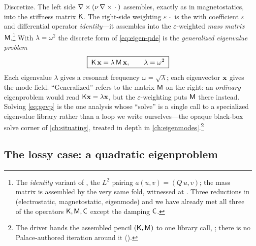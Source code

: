 Discretize. The left side $\nabla\times(\nu\,\nabla\times\,\cdot\,)$ assembles, exactly as in
magnetostatics, into the stiffness matrix $\mathsf{K}$. The right-side weighting
$\varepsilon\,\cdot$ is the  with coefficient
$\varepsilon$ and differential operator \emph{identity}---it assembles into the
$\varepsilon$-weighted \emph{mass matrix} $\mathsf{M}$.\footnote{The \emph{identity}
variant of , the $L^2$ pairing $a(u,v)=(Q\,u,v)$; the
mass matrix is assembled by the very same  fold, witnessed at
. Three reductions in (electrostatic,
magnetostatic, eigenmode) and we have already met all three of the operators
$\mathsf{K},\mathsf{M},\mathsf{C}$ except the damping $\mathsf{C}$.} With $\lambda=\omega^2$ the
discrete form of \cref{eq:eigen-pde} is the \emph{generalized eigenvalue
problem}
\begin{equation}
  \boxed{\;\mathsf{K}\,\mathbf{x} = \lambda\,\mathsf{M}\,\mathbf{x},\qquad \lambda=\omega^2\;}
  \label{eq:gevp}
\end{equation}
Each eigenvalue $\lambda$ gives a resonant frequency $\omega=\sqrt\lambda$; each
eigenvector $\mathbf{x}$ gives the mode field. ``Generalized'' refers to the matrix
$\mathsf{M}$ on the right: an \emph{ordinary} eigenproblem would read
$\mathsf{K}\mathbf{x}=\lambda\mathbf{x}$, but the $\varepsilon$-weighting puts $\mathsf{M}$ there instead.
Solving \cref{eq:gevp} is the one analysis whose ``solve'' is a single call to a
specialized eigenvalue library rather than a loop we write ourselves---the
opaque black-box solve corner of \cref{ch:situating}, treated in depth in
\cref{ch:eigenmodes}.\footnote{The driver hands the assembled pencil
$(\mathsf{K},\mathsf{M})$ to one library call, ; there is no
Palace-authored iteration around it ().}

\subsection{The lossy case: a quadratic eigenproblem}

